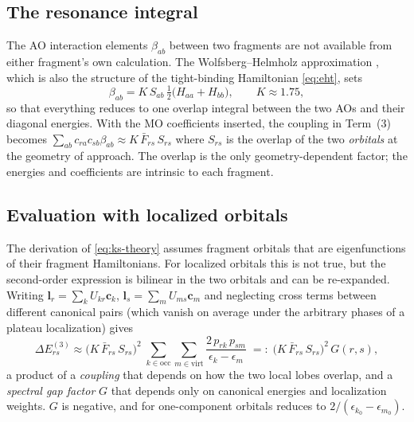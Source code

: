 \documentclass[11pt,a4paper]{article}
\newcommand{\occ}{\mathrm{occ}}
\newcommand{\virt}{\mathrm{virt}}
\newcommand{\vb}[1]{\bm{#1}}
\begin{document}
\subsection{The resonance integral}
The AO interaction elements $\beta_{ab}$ between two fragments are not available from either fragment's own calculation. The Wolfsberg--Helmholz approximation \cite{wh}, which is also the structure of the tight-binding Hamiltonian \eqref{eq:eht}, sets
\begin{equation}
\beta_{ab}=K\,S_{ab}\,\tfrac12\big(H_{aa}+H_{bb}\big),\qquad K\approx1.75,
\label{eq:wh-theory}
\end{equation}
so that everything reduces to one overlap integral between the two AOs and their diagonal energies. With the MO coefficients inserted, the coupling in Term~(3) becomes $\sum_{ab}c_{ra}c_{sb}\beta_{ab}\approx K\,\bar F_{rs}\,S_{rs}$ where $S_{rs}$ is the overlap of the two \emph{orbitals} at the geometry of approach. The overlap is the only geometry-dependent factor; the energies and coefficients are intrinsic to each fragment.

\subsection{Evaluation with localized orbitals}
\label{sec:pt-lmo}
The derivation of \eqref{eq:ks-theory} assumes fragment orbitals that are eigenfunctions of their fragment Hamiltonians. For localized orbitals this is not true, but the second-order expression is bilinear in the two orbitals and can be re-expanded. Writing $\vb{l}_r=\sum_k U_{kr}\vb{c}_k$, $\vb{l}_s=\sum_m U_{ms}\vb{c}_m$ and neglecting cross terms between different canonical pairs (which vanish on average under the arbitrary phases of a plateau localization) gives
\begin{equation}
\Delta E^{(3)}_{rs}\approx\big(K\,\bar F_{rs}\,S_{rs}\big)^2\;\sum_{k\in\occ}\sum_{m\in\virt}\frac{2\,p_{rk}\,p_{sm}}{\epsilon_k-\epsilon_m}
\;=:\;\big(K\,\bar F_{rs}\,S_{rs}\big)^2\,G(r,s),
\label{eq:ks3-theory}
\end{equation}
a product of a \emph{coupling} that depends on how the two local lobes overlap, and a \emph{spectral gap factor} $G$ that depends only on canonical energies and localization weights. $G$ is negative, and for one-component orbitals reduces to $2/(\epsilon_{k_0}-\epsilon_{m_0})$.
\end{document}
